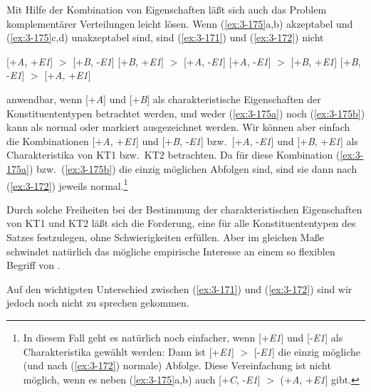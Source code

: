 \documentclass[output=paper]{langsci/langscibook}
\begin{document}
Mit Hilfe der Kombination von Eigenschaften läßt sich auch das Problem
komplementärer Verteilungen leicht lösen. Wenn \zb (\ref{ex:3-175}a,b)
akzeptabel und (\ref{ex:3-175}c,d) unakzeptabel sind, sind (\ref{ex:3-171}) und (\ref{ex:3-172})
nicht
\begin{exe}
\ex
\label{ex:3-175}
\begin{xlist}
\ex
\label{ex:3-175a}
[+\textit{A}, +\textit{E1}] $>$ [+\textit{B}, -\textit{E1}]
\ex
\label{ex:3-175b}
[+\textit{B}, +\textit{E1}]\hspace{0.1em} $>$ [+\textit{A}, -\textit{E1}]
\ex
\label{ex:3-175c}
[+\textit{A}, -\textit{E1}]\hspace{0.2em} $>$ [+\textit{B}, +\textit{E1}]
\ex
\label{ex:3-175d}
[+\textit{B}, -\textit{E1}]\hspace{0.1em} $>$ [+\textit{A}, +\textit{E1}]
\end{xlist}
\end{exe}
anwendbar, wenn [+\textit{A}] und [+\textit{B}] als charakteristische Eigenschaften der
Konstituententypen betrachtet werden, und weder (\ref{ex:3-175a}) noch (\ref{ex:3-175b}) kann als normal oder markiert ausgezeichnet werden. Wir können aber
einfach die Kombinationen [+\textit{A}, +\textit{E1}] und [+\textit{B}, -\textit{E1}]
bzw.\ [+\textit{A}, -\textit{E1}] und [+\textit{B}, +\textit{E1}] als Charakteristika von KT1
bzw.\ KT2 betrachten. Da für diese Kombination (\ref{ex:3-175a}) bzw.\ (\ref{ex:3-175b}) die einzig
möglichen Abfolgen sind, sind sie dann nach (\ref{ex:3-172}) jeweils
normal.\footnote{\label{fn:3-32}%
	In diesem Fall geht es natürlich noch einfacher, wenn [+\textit{E1}]
  und [-\textit{E1}] als Charakteristika gewählt werden: Dann ist [+\textit{E1}] $>$ [-\textit{E1}]
  die einzig mögliche (und nach (\ref{ex:3-172}) normale) Abfolge. Diese Vereinfachung ist nicht
  möglich, wenn es neben (\ref{ex:3-175}a,b) \zb auch [+\textit{C}, -\textit{E1}] $>$
  (+\textit{A}, +\textit{E1}] gibt.%
} 

Durch solche Freiheiten bei der Bestimmung der charakteristischen Eigenschaften von KT1 und KT2 läßt sich die Forderung, eine  für alle Konstituententypen des Satzes festzulegen, ohne Schwierigkeiten erfüllen. Aber im gleichen Maße schwindet natürlich das mögliche empirische Interesse an einem so flexiblen Begriff von
.

Auf den wichtigsten Unterschied zwischen (\ref{ex:3-171}) und (\ref{ex:3-172}) sind wir
jedoch noch nicht zu sprechen gekommen.
\end{document}
